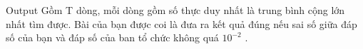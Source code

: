 Output  
Gồm T dòng, mỗi dòng gồm số thực duy nhất là trung bình cộng lớn nhất tìm được. Bài của bạn được coi là đưa ra kết quả đúng nếu sai số giữa đáp số của bạn và đáp số của ban tổ chức không quá $10^{-2}$   .